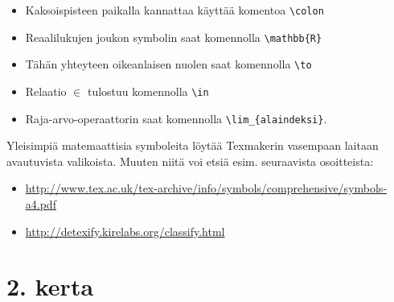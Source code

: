 \begin{frame}[fragile]
    
    \begin{itemize}
        \item Kaksoispisteen paikalla kannattaa käyttää komentoa \verb-\colon-
        \item Reaalilukujen joukon symbolin saat komennolla \verb-\mathbb{R}-
        \item Tähän yhteyteen oikeanlaisen nuolen saat komennolla \verb-\to-
        \item Relaatio \(\in\) tulostuu komennolla \verb-\in-
        \item Raja-arvo-operaattorin saat komennolla \verb-\lim_{alaindeksi}-.
    \end{itemize}
\end{frame}
\begin{frame}[fragile]
    
\end{frame}
\begin{frame}[fragile]
    Yleisimpiä matemaattisia symboleita löytää Texmakerin vasempaan laitaan avautuvista valikoista. Muuten niitä voi etsiä esim. seuraavista osoitteista:
    \begin{scriptsize}
        \begin{itemize}
            \item \url{http://www.tex.ac.uk/tex-archive/info/symbols/comprehensive/symbols-a4.pdf}
            \item \url{http://detexify.kirelabs.org/classify.html}
        \end{itemize}
    \end{scriptsize}
    

\end{frame}

\section{2. kerta}
